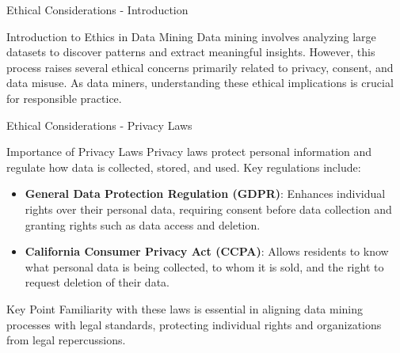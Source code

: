 \documentclass[aspectratio=169]{beamer}
\begin{document}
\begin{frame}[fragile]{Ethical Considerations - Introduction}
    \begin{block}{Introduction to Ethics in Data Mining}
        Data mining involves analyzing large datasets to discover patterns and extract meaningful insights. However, this process raises several ethical concerns primarily related to privacy, consent, and data misuse. As data miners, understanding these ethical implications is crucial for responsible practice.
    \end{block}
\end{frame}

\begin{frame}[fragile]{Ethical Considerations - Privacy Laws}
    \begin{block}{Importance of Privacy Laws}
        Privacy laws protect personal information and regulate how data is collected, stored, and used. Key regulations include:
    \end{block}

    \begin{itemize}
        \item \textbf{General Data Protection Regulation (GDPR)}: Enhances individual rights over their personal data, requiring consent before data collection and granting rights such as data access and deletion.
        
        \item \textbf{California Consumer Privacy Act (CCPA)}: Allows residents to know what personal data is being collected, to whom it is sold, and the right to request deletion of their data.
    \end{itemize}

    \begin{block}{Key Point}
        Familiarity with these laws is essential in aligning data mining processes with legal standards, protecting individual rights and organizations from legal repercussions.
    \end{block}
\end{frame}
\end{document}
